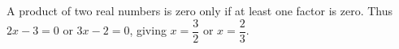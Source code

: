 A product of two real numbers is zero only if at least one factor is zero. Thus $2x-3=0$ or $3x-2=0$, giving $\boxed{x=\dfrac{3}{2}\text{ or }x=\dfrac{2}{3}}$.
